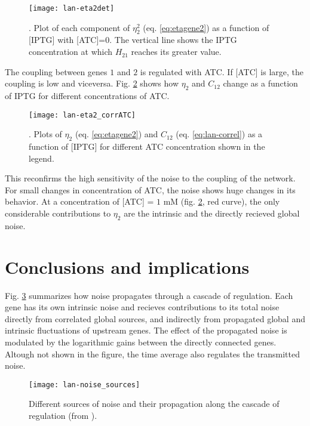 \begin{figure}[H]
  \centering
  \texttt{[image: lan-eta2det]}
  \caption[Components of the noise]{\label{fig:lan-eta2det}. Plot of each component of $\eta_2^2$ (eq. \eqref{eq:etagene2}) as a function of [IPTG] with [ATC]=0. The vertical line shows the IPTG concentration at which $H_{21}$ reaches its greater value.}
\end{figure}

The coupling between genes $1$ and $2$ is regulated with ATC. If [ATC] is large, the coupling is low and viceversa. Fig. \ref{fig:lan-eta2_corrATC} shows how $\eta_2$ and $C_{12}$ change as a function of IPTG for different concentrations of ATC.

\begin{figure}[H]
  \centering
  \texttt{[image: lan-eta2\_corrATC]}
  \caption[Noise in gene $2$ for varying ATC concentrations]{\label{fig:lan-eta2_corrATC}. Plots of $\eta_2$ (eq. \eqref{eq:etagene2}) and $C_{12}$ (eq. \eqref{eq:lan-correl}) as a function of [IPTG] for different ATC concentration shown in the legend.}
\end{figure}

This reconfirms the high sensitivity of the noise to the coupling of the network. For small changes in concentration of ATC, the noise shows huge changes in its behavior. At a concentration of [ATC] = $1$ mM (fig. \ref{fig:lan-eta2_corrATC}, red curve), the only considerable contributions to $\eta_2$ are the intrinsic and the directly recieved global noise.

\section{Conclusions and implications}

Fig. \ref{fig:lan-noise_sources} summarizes how noise propagates through a cascade of regulation. Each gene has its own intrinsic noise and recieves contributions to its total noise directly from correlated global sources, and indirectly from propagated global and intrinsic fluctuations of upstream genes. The effect of the propagated noise is modulated by the logarithmic gains between the directly connected genes. Altough not shown in the figure, the time average also regulates the transmitted noise.

\begin{figure}[H]
  \centering
  \texttt{[image: lan-noise\_sources]}
  \caption[Propagation of noise through a cascade]{\label{fig:lan-noise_sources} Different sources of noise and their propagation along the cascade of regulation (from \cite{pedraza05}).}
\end{figure}

